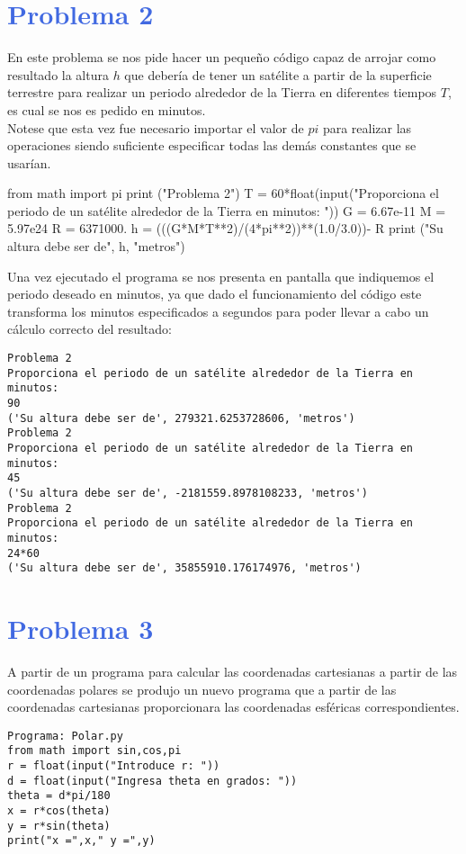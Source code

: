 \documentclass[12pt]{article}
\begin{document}
\section*{\textcolor{RoyalBlue}{Problema 2}}
En este problema se nos pide hacer un pequeño código capaz de arrojar como resultado la altura $h$ que debería de tener un satélite a partir de la superficie terrestre para realizar un periodo alrededor de la Tierra en diferentes tiempos $T$, es cual se nos es pedido en minutos.\\
Notese que esta vez fue necesario importar el valor de $pi$ para realizar las operaciones siendo suficiente especificar todas las demás constantes que se usarían.
\begin{center}
\begin{boxedverbatim}
from math import pi
print ("Problema 2")
T = 60*float(input("Proporciona el periodo de un satélite alrededor 
de la Tierra en minutos: "))
G = 6.67e-11
M = 5.97e24
R = 6371000.
h = (((G*M*T**2)/(4*pi**2))**(1.0/3.0))- R
print ("Su altura debe ser de", h, "metros")
\end{boxedverbatim}
\end{center}

Una vez ejecutado el programa se nos presenta en pantalla que indiquemos el periodo deseado en minutos, ya que dado el funcionamiento del código este transforma los minutos especificados a segundos para poder llevar a cabo un cálculo correcto del resultado:
\begin{center}
\begin{verbatim}
Problema 2
Proporciona el periodo de un satélite alrededor de la Tierra en minutos: 
90
('Su altura debe ser de', 279321.6253728606, 'metros')
Problema 2
Proporciona el periodo de un satélite alrededor de la Tierra en minutos: 
45
('Su altura debe ser de', -2181559.8978108233, 'metros')
Problema 2
Proporciona el periodo de un satélite alrededor de la Tierra en minutos: 
24*60
('Su altura debe ser de', 35855910.176174976, 'metros')
\end{verbatim}
\end{center}
\pagebreak
\section*{\textcolor{RoyalBlue}{Problema 3}}
A partir de un programa para calcular las coordenadas cartesianas a partir de las coordenadas polares se produjo un nuevo programa que a partir de las coordenadas cartesianas proporcionara las coordenadas esféricas\cite{2} correspondientes.
\begin{verbatim}
Programa: Polar.py 
from math import sin,cos,pi
r = float(input("Introduce r: "))
d = float(input("Ingresa theta en grados: "))
theta = d*pi/180
x = r*cos(theta)
y = r*sin(theta)
print("x =",x," y =",y)
\end{verbatim}
\end{document}
